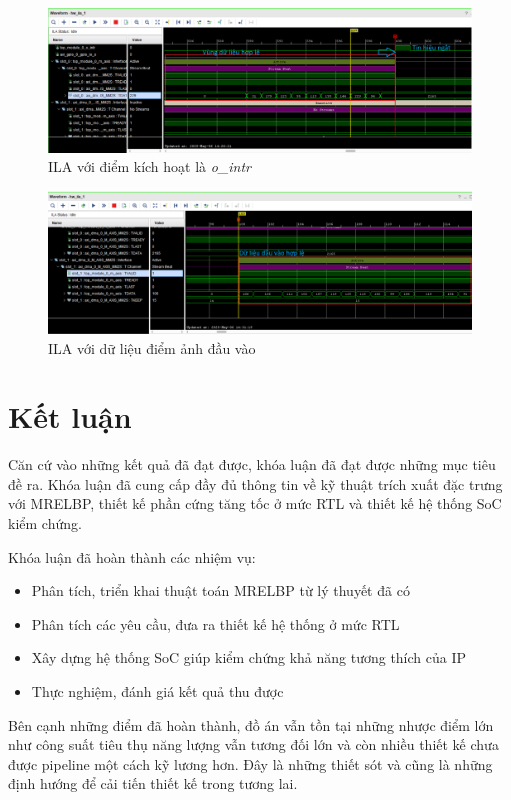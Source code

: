 \begin{figure}[!ht]
	\centering
	\includegraphics[width=\linewidth]{figures/ila1.png}
	\caption{ILA với điểm kích hoạt là \textit{o\_intr}}
	\label{fig:ila1}
\end{figure}



\begin{figure}[H]
	\centering
	\includegraphics[width=\linewidth]{figures/ila3.png}
	\caption{ILA với dữ liệu điểm ảnh đầu vào}
	\label{fig:ila3}
\end{figure}

\section{Kết luận}
Căn cứ vào những kết quả đã đạt được, khóa luận đã đạt được những mục tiêu đề ra. Khóa luận đã cung cấp đầy đủ thông tin về kỹ thuật trích xuất đặc trưng với MRELBP, thiết kế phần cứng tăng tốc ở mức RTL và thiết kế hệ thống SoC kiểm chứng.  

Khóa luận đã hoàn thành các nhiệm vụ:
\begin{itemize}
	\item Phân tích, triển khai thuật toán MRELBP từ lý thuyết đã có
	\item Phân tích các yêu cầu, đưa ra thiết kế hệ thống ở mức RTL
	\item Xây dựng hệ thống SoC giúp kiểm chứng khả năng tương thích của IP
	\item Thực nghiệm, đánh giá kết quả thu được 
\end{itemize}


Bên cạnh những điểm đã hoàn thành, đồ án vẫn tồn tại những nhược điểm lớn như công suất tiêu thụ năng lượng vẫn tương đối lớn và còn nhiều thiết kế chưa được pipeline một cách kỹ lương hơn. Đây là những thiết sót và cũng là những định hướng để cải tiến thiết kế trong tương lai.